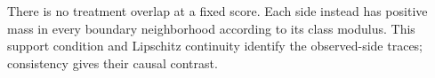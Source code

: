 There is no treatment overlap at a fixed score. Each side instead has positive mass in every boundary neighborhood according to its class modulus. This support condition and Lipschitz continuity identify the observed-side traces; consistency gives their causal contrast.